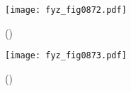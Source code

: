     \begin{figure}[ht!] %
      \centering
      \texttt{[image: fyz\_fig0872.pdf]}
      \caption{
               (\cite[s.~707]{Feynman02})}
      \label{fyz:fig0872}
    \end{figure}

    \begin{figure}[ht!] %
      \centering
      \texttt{[image: fyz\_fig0873.pdf]}
      \caption{
               (\cite[s.~707]{Feynman02})}
      \label{fyz:fig0873}
    \end{figure}
 
